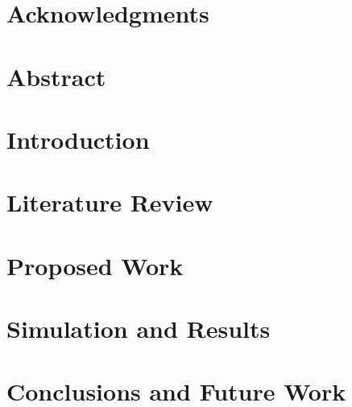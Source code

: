 \documentclass[a4paper, 11pt, oneside]{Dissertation}
\begin{document}
\sloppy
{}








\chapter*{Acknowledgments}
\label{ch:ack}


\chapter*{Abstract}
\label{ch:ack}




\pagestyle{fancy}
\tableofcontents
\listoffigures
\listoftables
\newpage

\mainmatter	  

\chapter{Introduction}
\label{ch:intro}


\chapter{Literature Review}
\label{ch:literature}


\chapter{Proposed Work}
\label{ch:new}


\chapter{Simulation and Results}
\label{ch:result}


\chapter{Conclusions and Future Work}
\label{ch:conclude}


\newpage
{}
\small{{}}

\end{document}
